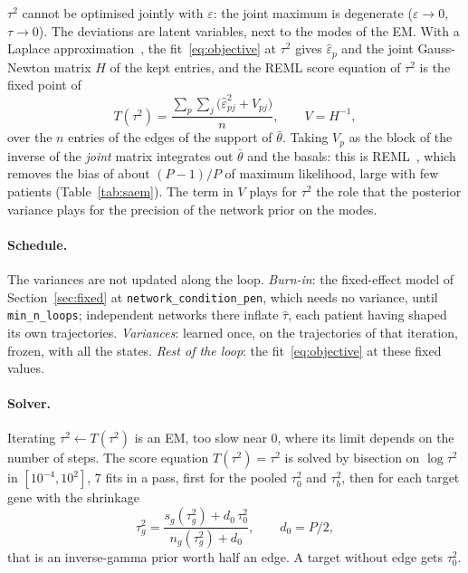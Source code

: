 \documentclass[a4paper, 11pt]{article}
\newcommand{\tb}{\bar\theta}
\theoremstyle{plain}
\theoremstyle{remark}
\begin{document}
$\tau^2$ cannot be optimised jointly with $\varepsilon$: the joint maximum is degenerate ($\varepsilon \to 0$, $\tau \to 0$). The deviations are latent variables, next to the modes of the EM. With a Laplace approximation~\cite{laird1982random, breslow1993approximate}, the fit~\eqref{eq:objective} at $\tau^2$ gives $\hat\varepsilon_p$ and the joint Gauss-Newton matrix $H$ of the kept entries, and the REML score equation of $\tau^2$ is the fixed point of
\begin{equation}\label{eq:tau}
T(\tau^2) = \frac{\sum_p \sum_{j} \big(\hat\varepsilon_{pj}^2 + V_{pj}\big)}{n}, \qquad V = H^{-1},
\end{equation}
over the $n$ entries of the edges of the support of $\tb$. Taking $V_p$ as the block of the inverse of the \emph{joint} matrix integrates out $\tb$ and the basals: this is REML~\cite{patterson1971recovery}, which removes the bias of about $(P-1)/P$ of maximum likelihood, large with few patients (Table~\ref{tab:saem}). The term in $V$ plays for $\tau^2$ the role that the posterior variance plays for the precision of the network prior on the modes.

\paragraph{Schedule.} The variances are not updated along the loop. \emph{Burn-in}: the fixed-effect model of Section~\ref{sec:fixed} at \texttt{network\_condition\_pen}, which needs no variance, until \texttt{min\_n\_loops}; independent networks there inflate $\hat\tau$, each patient having shaped its own trajectories. \emph{Variances}: learned once, on the trajectories of that iteration, frozen, with all the states. \emph{Rest of the loop}: the fit~\eqref{eq:objective} at these fixed values.

\paragraph{Solver.} Iterating $\tau^2 \leftarrow T(\tau^2)$ is an EM, too slow near $0$, where its limit depends on the number of steps. The score equation $T(\tau^2) = \tau^2$ is solved by bisection on $\log \tau^2$ in $[10^{-4}, 10^2]$, $7$ fits in a pass, first for the pooled $\tau_0^2$ and $\tau_b^2$, then for each target gene with the shrinkage
\begin{equation}\label{eq:shrink}
\tau_g^2 = \frac{s_g(\tau_g^2) + d_0\, \tau_0^2}{n_g(\tau_g^2) + d_0}, \qquad d_0 = P / 2,
\end{equation}
that is an inverse-gamma prior worth half an edge. A target without edge gets $\tau_0^2$.
\end{document}

